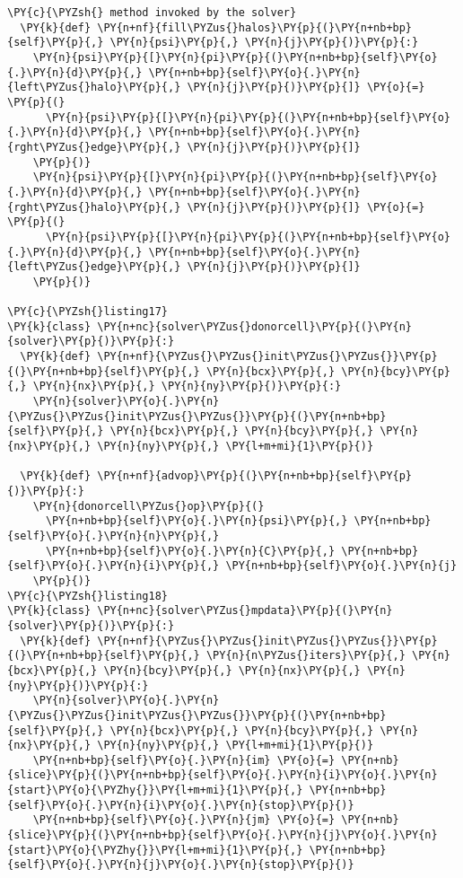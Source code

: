 \begin{Verbatim}[commandchars=\\\{\}]
  \PY{c}{\PYZsh{} method invoked by the solver}
  \PY{k}{def} \PY{n+nf}{fill\PYZus{}halos}\PY{p}{(}\PY{n+nb+bp}{self}\PY{p}{,} \PY{n}{psi}\PY{p}{,} \PY{n}{j}\PY{p}{)}\PY{p}{:}
    \PY{n}{psi}\PY{p}{[}\PY{n}{pi}\PY{p}{(}\PY{n+nb+bp}{self}\PY{o}{.}\PY{n}{d}\PY{p}{,} \PY{n+nb+bp}{self}\PY{o}{.}\PY{n}{left\PYZus{}halo}\PY{p}{,} \PY{n}{j}\PY{p}{)}\PY{p}{]} \PY{o}{=} \PY{p}{(}
      \PY{n}{psi}\PY{p}{[}\PY{n}{pi}\PY{p}{(}\PY{n+nb+bp}{self}\PY{o}{.}\PY{n}{d}\PY{p}{,} \PY{n+nb+bp}{self}\PY{o}{.}\PY{n}{rght\PYZus{}edge}\PY{p}{,} \PY{n}{j}\PY{p}{)}\PY{p}{]}
    \PY{p}{)}
    \PY{n}{psi}\PY{p}{[}\PY{n}{pi}\PY{p}{(}\PY{n+nb+bp}{self}\PY{o}{.}\PY{n}{d}\PY{p}{,} \PY{n+nb+bp}{self}\PY{o}{.}\PY{n}{rght\PYZus{}halo}\PY{p}{,} \PY{n}{j}\PY{p}{)}\PY{p}{]} \PY{o}{=} \PY{p}{(}
      \PY{n}{psi}\PY{p}{[}\PY{n}{pi}\PY{p}{(}\PY{n+nb+bp}{self}\PY{o}{.}\PY{n}{d}\PY{p}{,} \PY{n+nb+bp}{self}\PY{o}{.}\PY{n}{left\PYZus{}edge}\PY{p}{,} \PY{n}{j}\PY{p}{)}\PY{p}{]}
    \PY{p}{)}

\PY{c}{\PYZsh{}listing17}
\PY{k}{class} \PY{n+nc}{solver\PYZus{}donorcell}\PY{p}{(}\PY{n}{solver}\PY{p}{)}\PY{p}{:}
  \PY{k}{def} \PY{n+nf}{\PYZus{}\PYZus{}init\PYZus{}\PYZus{}}\PY{p}{(}\PY{n+nb+bp}{self}\PY{p}{,} \PY{n}{bcx}\PY{p}{,} \PY{n}{bcy}\PY{p}{,} \PY{n}{nx}\PY{p}{,} \PY{n}{ny}\PY{p}{)}\PY{p}{:}
    \PY{n}{solver}\PY{o}{.}\PY{n}{\PYZus{}\PYZus{}init\PYZus{}\PYZus{}}\PY{p}{(}\PY{n+nb+bp}{self}\PY{p}{,} \PY{n}{bcx}\PY{p}{,} \PY{n}{bcy}\PY{p}{,} \PY{n}{nx}\PY{p}{,} \PY{n}{ny}\PY{p}{,} \PY{l+m+mi}{1}\PY{p}{)}

  \PY{k}{def} \PY{n+nf}{advop}\PY{p}{(}\PY{n+nb+bp}{self}\PY{p}{)}\PY{p}{:}
    \PY{n}{donorcell\PYZus{}op}\PY{p}{(}
      \PY{n+nb+bp}{self}\PY{o}{.}\PY{n}{psi}\PY{p}{,} \PY{n+nb+bp}{self}\PY{o}{.}\PY{n}{n}\PY{p}{,} 
      \PY{n+nb+bp}{self}\PY{o}{.}\PY{n}{C}\PY{p}{,} \PY{n+nb+bp}{self}\PY{o}{.}\PY{n}{i}\PY{p}{,} \PY{n+nb+bp}{self}\PY{o}{.}\PY{n}{j}
    \PY{p}{)}
\PY{c}{\PYZsh{}listing18}
\PY{k}{class} \PY{n+nc}{solver\PYZus{}mpdata}\PY{p}{(}\PY{n}{solver}\PY{p}{)}\PY{p}{:}
  \PY{k}{def} \PY{n+nf}{\PYZus{}\PYZus{}init\PYZus{}\PYZus{}}\PY{p}{(}\PY{n+nb+bp}{self}\PY{p}{,} \PY{n}{n\PYZus{}iters}\PY{p}{,} \PY{n}{bcx}\PY{p}{,} \PY{n}{bcy}\PY{p}{,} \PY{n}{nx}\PY{p}{,} \PY{n}{ny}\PY{p}{)}\PY{p}{:}
    \PY{n}{solver}\PY{o}{.}\PY{n}{\PYZus{}\PYZus{}init\PYZus{}\PYZus{}}\PY{p}{(}\PY{n+nb+bp}{self}\PY{p}{,} \PY{n}{bcx}\PY{p}{,} \PY{n}{bcy}\PY{p}{,} \PY{n}{nx}\PY{p}{,} \PY{n}{ny}\PY{p}{,} \PY{l+m+mi}{1}\PY{p}{)}
    \PY{n+nb+bp}{self}\PY{o}{.}\PY{n}{im} \PY{o}{=} \PY{n+nb}{slice}\PY{p}{(}\PY{n+nb+bp}{self}\PY{o}{.}\PY{n}{i}\PY{o}{.}\PY{n}{start}\PY{o}{\PYZhy{}}\PY{l+m+mi}{1}\PY{p}{,} \PY{n+nb+bp}{self}\PY{o}{.}\PY{n}{i}\PY{o}{.}\PY{n}{stop}\PY{p}{)}
    \PY{n+nb+bp}{self}\PY{o}{.}\PY{n}{jm} \PY{o}{=} \PY{n+nb}{slice}\PY{p}{(}\PY{n+nb+bp}{self}\PY{o}{.}\PY{n}{j}\PY{o}{.}\PY{n}{start}\PY{o}{\PYZhy{}}\PY{l+m+mi}{1}\PY{p}{,} \PY{n+nb+bp}{self}\PY{o}{.}\PY{n}{j}\PY{o}{.}\PY{n}{stop}\PY{p}{)}


\end{Verbatim}
